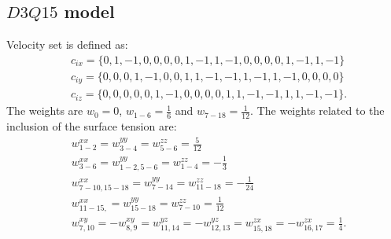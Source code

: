 \documentclass{CFD2011}
\begin{document}
\subsection{$D3Q15$ model}
Velocity set is defined as:
\begin{equation} 
\begin{aligned}
&c_{ix}=\{0,1,-1,0, 0,0, 0,1,-1, 1,-1,0, 0, 0, 0,1,-1, 1,-1\}\\
&c_{iy}=\{0,0, 0,1,-1,0, 0,1, 1,-1,-1,1,-1, 1,-1,0, 0, 0, 0\}\\
&c_{iz}=\{0,0, 0,0, 0,1,-1,0, 0, 0, 0,1, 1,-1,-1,1, 1,-1,-1\}.
\end{aligned}
\end{equation}
The weights are $w_0=0$, $w_{1-6}=\frac{1}{6}$ and $w_{7-18}=\frac{1}{12}$. The weights
related to the inclusion of the surface tension are:
\begin{equation}
\begin{aligned}
&w^{xx}_{1-2}=w^{yy}_{3-4}=w^{zz}_{5-6}=\frac{5}{12}\\
&w^{xx}_{3-6}=w^{yy}_{1-2,5-6}=w^{zz}_{1-4}=-\frac{1}{3}\\
&w^{xx}_{7-10,15-18}=w^{yy}_{7-14}=w^{zz}_{11-18}=-\frac{1}{24}\\
&w^{xx}_{11-15,}=w^{yy}_{15-18}=w^{zz}_{7-10}=\frac{1}{12}\\
&w^{xy}_{7,10}=-w^{xy}_{8,9}=w^{yz}_{11,14}=-w^{yz}_{12,13}=w^{zx}_{15,18}=-w^{zx}_{16,17}=\frac{1}{
4}.
\end{aligned}
\end{equation}
\end{document}
